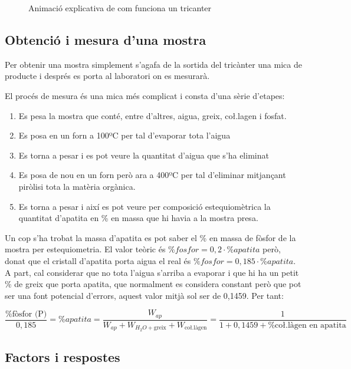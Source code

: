 \documentclass[a4paper]{article}
\begin{document}
\begin{figure}[H]
	\centering
	\caption{Animació explicativa de com funciona un tricanter}
\end{figure}

\subsection{Obtenció i mesura d'una mostra}
Per obtenir una mostra simplement s'agafa de la sortida del tricànter una mica de producte i després es porta al laboratori on es mesurarà.

El procés de mesura és una mica més complicat i consta d'una sèrie d'etapes:

\begin{enumerate}
	\item Es pesa la mostra que conté, entre d'altres, aigua, greix, co\l.lagen i fosfat.
	\item Es posa en un forn a 100ºC per tal d'evaporar tota l'aigua 
	\item Es torna a pesar i es pot veure la quantitat d'aigua que s'ha eliminat
	\item Es posa de nou en un forn però ara a 400ºC per tal d'eliminar mitjançant piròlisi tota la matèria orgànica.
	\item Es torna a pesar i així es pot veure per composició estequiomètrica la quantitat d'apatita en \% en massa que hi havia a la mostra presa.
\end{enumerate} 

Un cop s'ha trobat la massa d'apatita es pot saber el \% en massa de fòsfor de la mostra per estequiometria. El valor teòric és $\% fosfor = 0,2 \cdot \% apatita$ però, donat que el cristall d'apatita porta aigua el real és $\% fosfor = 0,185 \cdot \% apatita$. A part, cal considerar que no tota l'aigua s'arriba a evaporar i que hi ha un petit \% de greix que porta apatita, que normalment es considera constant però que pot ser una font potencial d'errors, aquest valor mitjà sol ser de 0,1459. Per tant:

$$
\frac{\% \text{fòsfor (P)}}{0,185} = \% apatita = 
\frac{W_{ap}}{W_{ap} + W_{H_2O + \text{greix}} + W_{\text{co\l.làgen}}} =
\frac{1}{1 + 0,1459 + \% \text{co\l.làgen en apatita}}
$$

\subsection{Factors i respostes}
\end{document}
